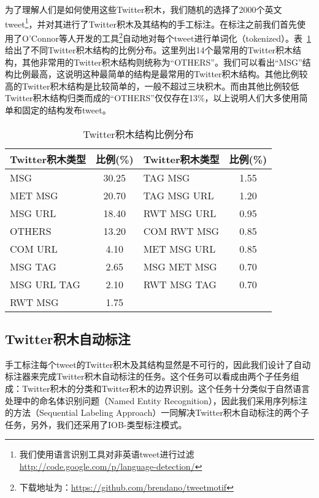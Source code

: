 为了理解人们是如何使用这些Twitter积木，我们随机的选择了2000个英文tweet\footnote{我们使用语言识别工具对非英语tweet进行过滤 \url{http://code.google.com/p/language-detection/}}，并对其进行了Twitter积木及其结构的手工标注。在标注之前我们首先使用了O'Connor等人开发的工具\footnote{下载地址为：\url{https://github.com/brendano/tweetmotif}}自动地对每个tweet进行单词化（tokenized）。表~\ref{TBB_Distr}给出了不同Twitter积木结构的比例分布。这里列出14个最常用的Twitter积木结构，其他非常用的Twitter积木结构则统称为“OTHERS”。我们可以看出“MSG”结构比例最高，这说明这种最简单的结构是最常用的Twitter积木结构。其他比例较高的Twitter积木结构是比较简单的，一般不超过三块积木。而由其他比例较低Twitter积木结构归类而成的“OTHERS”仅仅存在13\%，以上说明人们大多使用简单和固定的结构发布tweet。

\begin{table}[htp]
\centering
\caption{Twitter积木结构比例分布}
\label{TBB_Distr}
\begin{tabular}{|l |c|l |c|}
\hline
\textbf{Twitter积木类型} &\textbf{比例(\%)}&\textbf{Twitter积木类型} &\textbf{比例(\%)}\\
\hline
MSG & 30.25&TAG MSG & 1.55\\
MET MSG & 20.70&TAG MSG URL & 1.20\\
MSG URL & 18.40&RWT MSG URL & 0.95\\
OTHERS & 13.20&COM RWT MSG & 0.85\\
COM URL & 4.10&MET MSG URL & 0.85\\
MSG TAG & 2.65&MSG MET MSG & 0.70\\
MSG URL TAG & 2.10&RWT MSG TAG & 0.70\\
RWT MSG & 1.75&&\\
\hline
\end{tabular}
\end{table}

\subsection{Twitter积木自动标注}
手工标注每个tweet的Twitter积木及其结构显然是不可行的，因此我们设计了自动标注器来完成Twitter积木自动标注的任务。这个任务可以看成由两个子任务组成：Twitter积木的分类和Twitter积木的边界识别。这个任务十分类似于自然语言处理中的命名体识别问题（Named Entity Recognition），因此我们采用序列标注的方法（Sequential Labeling Approach）一同解决Twitter积木自动标注的两个子任务，另外，我们还采用了IOB-类型标注模式。

